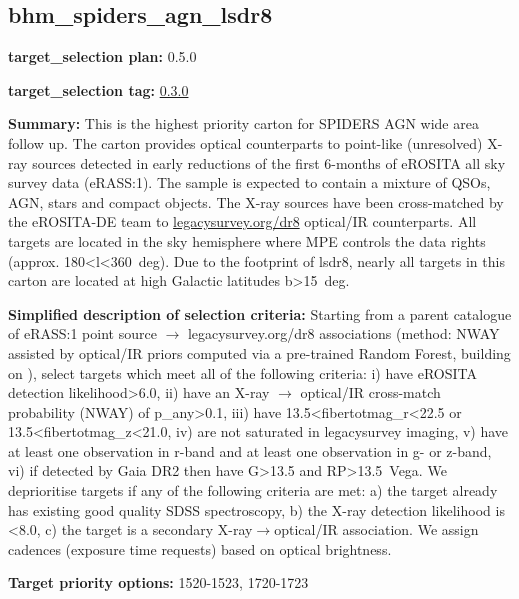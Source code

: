 \hypertarget{bhm_spiders_agn_lsdr8_plan0.5.0}{%
\subsection{bhm\_spiders\_agn\_lsdr8}\label{bhm_spiders_agn_lsdr8_plan0.5.0}}

\noindent\textbf{target\_selection plan:} 0.5.0

\noindent\textbf{target\_selection tag:}
\href{https://github.com/sdss/target_selection/tree/0.3.0/}{0.3.0}

\noindent\textbf{Summary:} This is the highest priority carton for SPIDERS AGN
wide area follow up. The carton provides optical counterparts to
point-like (unresolved) X-ray sources detected in early reductions of
the first 6-months of eROSITA all sky survey data (eRASS:1). The sample
is expected to contain a mixture of QSOs, AGN, stars and compact
objects. The X-ray sources have been cross-matched by the eROSITA-DE
team to \href{https://www.legacysurvey.org/dr8/}{legacysurvey.org/dr8}
optical/IR counterparts. All targets are located in the sky hemisphere
where MPE controls the data rights (approx.
180\textless l\textless360~deg). Due to the footprint of lsdr8, nearly
all targets in this carton are located at high Galactic latitudes
\textbar b\textbar\textgreater15~deg.

\noindent\textbf{Simplified description of selection criteria:} Starting from a
parent catalogue of eRASS:1 point source $\rightarrow$ legacysurvey.org/dr8
associations (method: NWAY assisted by optical/IR priors computed via a
pre-trained Random Forest, building on
\citealt{Salvato2022}), select targets which meet all of the following criteria:
i) have eROSITA detection likelihood\textgreater6.0, ii) have an X-ray $\rightarrow$
optical/IR cross-match probability (NWAY) of p\_any\textgreater0.1, iii)
have 13.5\textless fibertotmag\_r\textless22.5 or
13.5\textless fibertotmag\_z\textless21.0, iv) are not saturated in
legacysurvey imaging, v) have at least one observation in r-band and at
least one observation in g- or z-band, vi) if detected by Gaia DR2 then
have G\textgreater13.5 and RP\textgreater13.5~Vega. We deprioritise
targets if any of the following criteria are met: a) the target already
has existing good quality SDSS spectroscopy, b) the X-ray detection
likelihood is \textless8.0, c) the target is a secondary
X-ray$\rightarrow$optical/IR association. We assign cadences (exposure time
requests) based on optical brightness.


\noindent\textbf{Target priority options:} 1520-1523, 1720-1723

